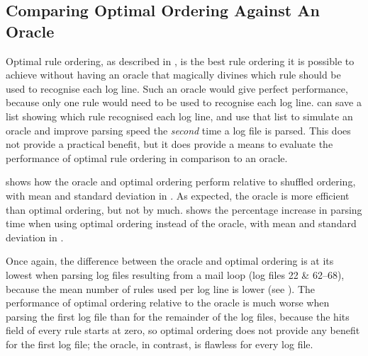 

\FloatBarrier{}

\subsection{Comparing Optimal Ordering Against An Oracle}

\label{perfect rule ordering}

Optimal rule ordering, as described in , is the best rule ordering it is possible to achieve without
having an oracle that magically divines which rule should be used to
recognise each log line.  Such an oracle would give perfect performance,
because only one rule would need to be used to recognise each log line.
\parsername{} can save a list showing which rule recognised each log line,
and use that list to simulate an oracle and improve parsing speed the
\textit{second\/} time a log file is parsed.  This does not provide a
practical benefit, but it does provide a means to evaluate the performance
of optimal rule ordering in comparison to an oracle.

 shows how the oracle and optimal ordering perform relative
to shuffled ordering, with mean and standard deviation in .
As expected, the oracle is more efficient than optimal ordering, but not by
much.   shows the percentage increase in parsing
time when using optimal ordering instead of the oracle, with mean and
standard deviation in .

Once again, the difference between the oracle and optimal ordering is at
its lowest when parsing log files resulting from a mail loop (log files 22
\& 62--68), because the mean number of rules used per log line is lower
(see ).  The performance
of optimal ordering relative to the oracle is much worse when parsing the
first log file than for the remainder of the log files, because the hits
field of every rule starts at zero, so optimal ordering does not provide
any benefit for the first log file; the oracle, in contrast, is flawless
for every log file.

